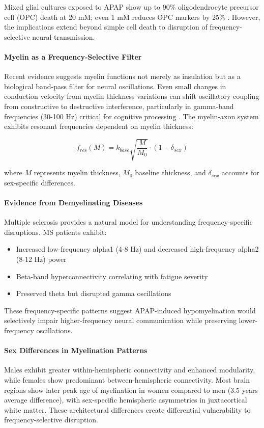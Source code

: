 \documentclass[12pt]{article}
\begin{document}
Mixed glial cultures exposed to APAP show up to 90\% oligodendrocyte precursor cell (OPC) death at 20 mM; even 1 mM reduces OPC markers by 25\% \citep{perez2012}. However, the implications extend beyond simple cell death to disruption of frequency-selective neural transmission.

\paragraph{Myelin as a Frequency-Selective Filter}
Recent evidence suggests myelin functions not merely as insulation but as a biological band-pass filter for neural oscillations. Even small changes in conduction velocity from myelin thickness variations can shift oscillatory coupling from constructive to destructive interference, particularly in gamma-band frequencies (30-100 Hz) critical for cognitive processing \citep{pajevic2014}. The myelin-axon system exhibits resonant frequencies dependent on myelin thickness:

\begin{equation}
f_{res}(M) = k_{base} \sqrt{\frac{M}{M_0}} \cdot \left(1 - \delta_{sex}\right)
\end{equation}

where $M$ represents myelin thickness, $M_0$ baseline thickness, and $\delta_{sex}$ accounts for sex-specific differences.

\paragraph{Evidence from Demyelinating Diseases}
Multiple sclerosis provides a natural model for understanding frequency-specific disruptions. MS patients exhibit:
\begin{itemize}
\item Increased low-frequency alpha1 (4-8 Hz) and decreased high-frequency alpha2 (8-12 Hz) power
\item Beta-band hyperconnectivity correlating with fatigue severity  
\item Preserved theta but disrupted gamma oscillations
\end{itemize}

These frequency-specific patterns suggest APAP-induced hypomyelination would selectively impair higher-frequency neural communication while preserving lower-frequency oscillations.

\paragraph{Sex Differences in Myelination Patterns}
Males exhibit greater within-hemispheric connectivity and enhanced modularity, while females show predominant between-hemispheric connectivity. Most brain regions show later peak age of myelination in women compared to men (3.5 years average difference), with sex-specific hemispheric asymmetries in juxtacortical white matter. These architectural differences create differential vulnerability to frequency-selective disruption.
\end{document}
